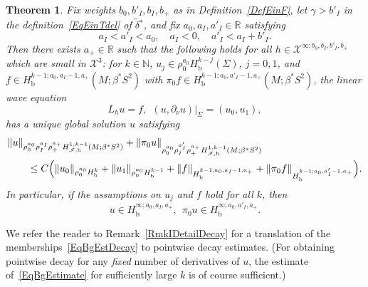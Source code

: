 \documentclass[reqno,11pt,letterpaper]{amsart}
\numberwithin{equation}{section}
\numberwithin{figure}{section}
\newtheorem{thm}{Theorem}[section]
\theoremstyle{definition}
\theoremstyle{remark}
\newcommand{\mc}{\mathcal}
\newcommand{\cX}{\mc X}
\newcommand{\ms}{\mathscr}
\newcommand{\scri}{\ms I}
\newcommand{\N}{\mathbb{N}}
\newcommand{\R}{\mathbb{R}}
\newcommand{\pa}{\partial}
\newcommand{\wt}{\widetilde}
\newcommand{\bop}{{\mathrm{b}}}
\newcommand{\Hb}{H_{\bop}}
\newcommand{\Hscrib}{H_{\scri,\bop}}
\newcommand{\tdel}{\wt{\delta}{}}
\newcommand{\usref}[1]{{\upshape\ref{#1}}}
\begin{document}
\begin{thm}
\label{ThmBg}
  Fix weights $b_0,b'_I,b_I,b_+$ as in Definition~\usref{DefEinF}, let $\gamma>b'_I$ in the definition~\eqref{EqEinTdel} of $\tdel^*$, and fix $a_0,a_I,a'_I\in\R$ satisfying
  \[
    a_I<a'_I<a_0, \quad
    a_I<0, \quad
    a'_I<a_I+b'_I.
  \]
  Then there exists $a_+\in\R$ such that the following holds for all $h\in\cX^{\infty;b_0,b_I,b'_I,b_+}$ which are small in $\cX^3$: for $k\in\N$, $u_j\in\rho_0^{a_0}\Hb^{k-j}(\Sigma)$, $j=0,1$, and $f\in\Hb^{k-1;a_0,a_I-1,a_+}(M;\beta^*S^2)$ with $\pi_0 f\in\Hb^{k-1;a_0,a'_I-1,a_+}(M;\beta^*S^2)$, the linear wave equation
  \begin{equation}
  \label{EqBgEquation}
    L_h u = f, \ \ (u,\pa_\nu u)|_\Sigma = (u_0,u_1),
  \end{equation}
  has a unique global solution $u$ satisfying
  \begin{equation}
  \label{EqBgEstimate}
  \begin{split}
    &\| u \|_{\rho_0^{a_0}\rho_I^{a_I}\rho_+^{a_+}\Hscrib^{1,k-1}(M;\beta^*S^2)} + \| \pi_0 u \|_{\rho_0^{a_0}\rho_I^{a'_I}\rho_+^{a_+}\Hscrib^{1,k-1}(M;\beta^*S^2)} \\
    &\qquad\leq C\Bigl(\| u_0 \|_{\rho_0^{a_0}\Hb^k} + \| u_1 \|_{\rho_0^{a_0}\Hb^{k-1}} + \| f \|_{\Hb^{k-1;a_0,a_I-1,a_+}} + \| \pi_0 f \|_{\Hb^{k-1;a_0,a'_I-1,a_+}}\Bigr).
  \end{split}
  \end{equation}
  In particular, if the assumptions on $u_j$ and $f$ hold for all $k$, then
  \begin{equation}
  \label{EqBgEstDecay}
    u\in\Hb^{\infty;a_0,a_I,a_+},\ \ 
    \pi_0 u\in\Hb^{\infty;a_0,a'_I,a_+}.
  \end{equation}
\end{thm}

We refer the reader to Remark~\ref{RmkIDetailDecay} for a translation of the memberships~\eqref{EqBgEstDecay} to pointwise decay estimates. (For obtaining pointwise decay for any \emph{fixed} number of derivatives of $u$, the estimate of~\eqref{EqBgEstimate} for sufficiently large $k$ is of course sufficient.)
\end{document}
